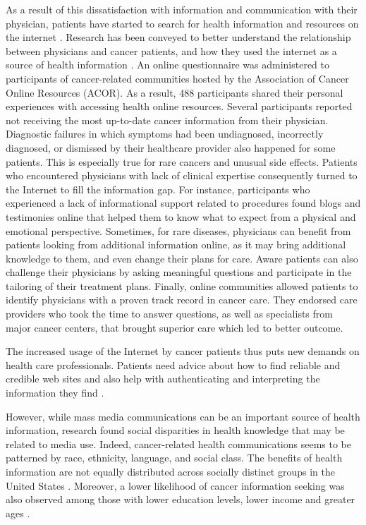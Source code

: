 As a result of this dissatisfaction with information and communication with their physician, patients have started to search for health information and resources on the internet \cite{chen_impact_2001,pereira_internet_2000,ziebland_how_2004,dolce_internet_2011}. Research has been conveyed to better understand the relationship between physicians and cancer patients, and how they used the internet as a source of health information \cite{dolce_internet_2011}. An online questionnaire was administered to participants of cancer-related communities hosted by the Association of Cancer Online Resources (ACOR). As a result, 488 participants shared their personal experiences with accessing health online resources. Several participants reported not receiving the most up-to-date cancer information from their physician. Diagnostic failures in which symptoms had been undiagnosed, incorrectly diagnosed, or dismissed by their healthcare provider also happened for some patients. This is especially true for rare cancers and unusual side effects. Patients who encountered physicians with lack of clinical expertise consequently turned to the Internet to fill the information gap. For instance, participants who experienced a lack of informational support related to procedures found blogs and testimonies online that helped them to know what to expect from a physical and emotional perspective. Sometimes, for rare diseases, physicians can benefit from patients looking from additional information online, as it may bring additional knowledge to them, and even change their plans for care. Aware patients can also challenge their physicians by asking meaningful questions and participate in the tailoring of their treatment plans. Finally, online communities allowed patients to identify physicians with a proven track record in cancer care. They endorsed care providers who took the time to answer questions, as well as specialists from major cancer centers, that brought superior care which led to better outcome.

The increased usage of the Internet by cancer patients thus puts new demands on health care professionals. Patients need advice about how to find reliable and credible web sites and also help with authenticating and interpreting the information they find \cite{carlsson_cancer_2009}.

However, while mass media communications can be an important source of health information, research found social disparities in health knowledge that may be related to media use. Indeed, cancer-related health communications seems to be patterned by race, ethnicity, language, and social class. The benefits of health information are not equally distributed across socially distinct groups in the United States \cite{viswanath_race_2011}. Moreover, a lower likelihood of cancer information seeking was also observed among those with lower education levels, lower income and greater ages \cite{finney_rutten_cancer-related_2016}.

